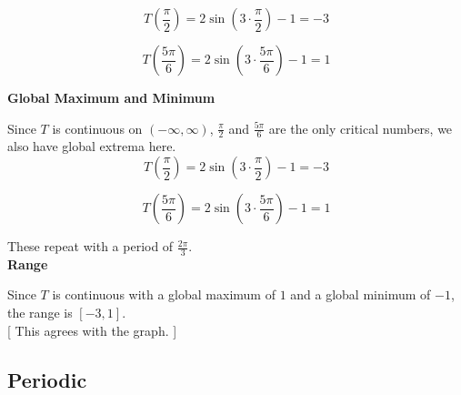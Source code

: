 \documentclass{ximera}
\begin{document}
\[
T\left( \frac{\pi}{2} \right) = 2 \sin\left(3 \cdot \frac{\pi}{2} \right) - 1 = -3
\]




\[
T\left( \frac{5\pi}{6} \right) = 2 \sin\left(3 \cdot \frac{5\pi}{6} \right) - 1 = 1
\]












\textbf{\textcolor{blue!55!black}{Global Maximum and Minimum}}


Since $T$ is continuous on $(-\infty, \infty)$, $\frac{\pi}{2}$ and $\frac{5\pi}{6}$ are the only critical numbers, we also have global extrema here. \\




\[
T\left( \frac{\pi}{2} \right) = 2 \sin\left(3 \cdot \frac{\pi}{2} \right) - 1 = -3
\]




\[
T\left( \frac{5\pi}{6} \right) = 2 \sin\left(3 \cdot \frac{5\pi}{6} \right) - 1 = 1
\]




These repeat with a period of $\frac{2\pi}{3}$. \\









\textbf{\textcolor{blue!55!black}{Range}}


Since $T$ is continuous with a global maximum of $1$ and a global minimum of $-1$, the range is $[-3, 1]$.  \\ 



[ This agrees with the graph. ]
























\subsection*{Periodic}
\end{document}
